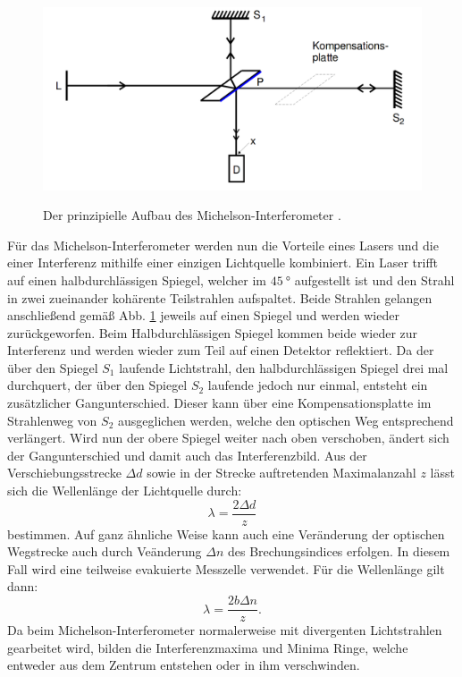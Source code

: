   \begin{figure}
  	\centering
  	\caption{Der prinzipielle Aufbau des Michelson-Interferometer \cite{V401}.}
  	\includegraphics[width=\linewidth-150pt,height=\textheight-150pt,keepaspectratio]{content/theoriebau.png}
  	\label{fig:aufbauth}
  \end{figure}
  Für das Michelson-Interferometer werden nun die Vorteile eines Lasers und die einer Interferenz mithilfe einer einzigen Lichtquelle kombiniert. Ein Laser trifft
  auf einen halbdurchlässigen Spiegel, welcher im $\SI{45}{\degree}$ aufgestellt ist und
  den Strahl in zwei zueinander kohärente Teilstrahlen aufspaltet. Beide Strahlen gelangen anschließend
  gemäß Abb. \ref{fig:aufbauth} jeweils auf einen Spiegel und werden wieder zurückgeworfen. Beim
  Halbdurchlässigen Spiegel kommen beide wieder zur Interferenz und werden wieder zum Teil auf
  einen Detektor reflektiert. Da der über den Spiegel $S_1$ laufende Lichtstrahl,
  den halbdurchlässigen Spiegel drei mal durchquert, der über den Spiegel $S_2$ laufende jedoch nur einmal,
  entsteht ein zusätzlicher Gangunterschied. Dieser kann über eine Kompensationsplatte im Strahlenweg von $S_2$ ausgeglichen werden, welche den optischen Weg entsprechend verlängert.
   Wird nun der obere Spiegel weiter nach oben verschoben,
  ändert sich der Gangunterschied und damit auch das Interferenzbild. Aus der Verschiebungsstrecke
  $\Delta d$ sowie in der Strecke auftretenden Maximalanzahl $z$ lässt sich die Wellenlänge der Lichtquelle durch:
  \begin{equation}
    \lambda = \frac{2 \Delta d}{z}\label{lambda}
    \end{equation}
    bestimmen. Auf ganz ähnliche Weise kann auch eine Veränderung der optischen Wegstrecke
     auch durch Veänderung $\Delta n$ des Brechungsindices erfolgen. In diesem Fall wird eine teilweise evakuierte Messzelle verwendet.
     Für die Wellenlänge gilt dann:
     \begin{equation}
       \lambda = \frac{2 b \Delta n }{z}\text{.}\label{nausdeltan}
       \end{equation}
Da beim Michelson-Interferometer normalerweise mit divergenten Lichtstrahlen gearbeitet wird,
bilden die Interferenzmaxima und Minima Ringe, welche entweder aus dem Zentrum entstehen oder in ihm verschwinden.
